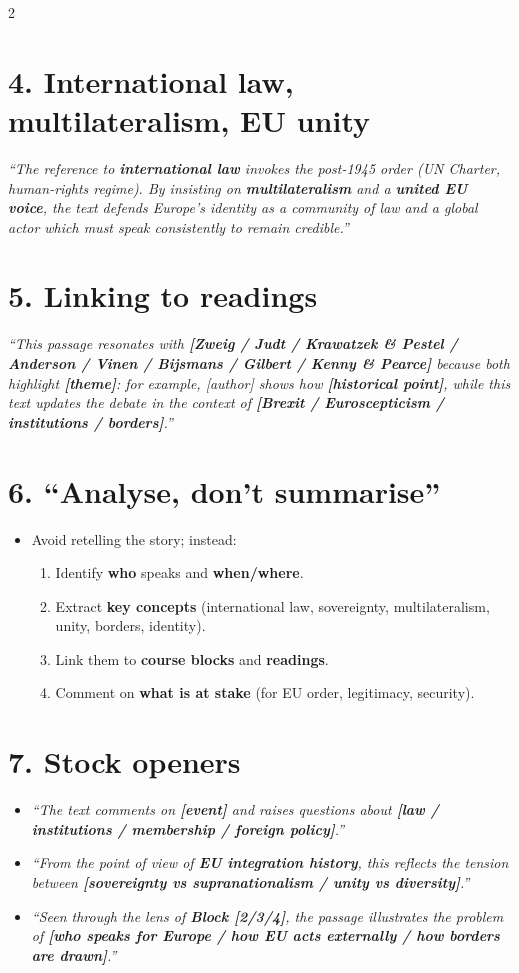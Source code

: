 \documentclass[10pt,a4paper]{article}
\begin{document}
\begin{multicols}{2}
\section*{\color{eublue}4. International law, multilateralism, EU unity}
\emph{``The reference to \textbf{international law} invokes the post-1945 order (UN Charter, human-rights regime). By insisting on \textbf{multilateralism} and a \textbf{united EU voice}, the text defends Europe’s identity as a community of law and a global actor which must speak consistently to remain credible.''}

\section*{\color{eublue}5. Linking to readings}
\emph{``This passage resonates with \textbf{[Zweig / Judt / Krawatzek \& Pestel / Anderson / Vinen / Bijsmans / Gilbert / Kenny \& Pearce]} because both highlight \textbf{[theme]}: for example, [author] shows how \textbf{[historical point]}, while this text updates the debate in the context of \textbf{[Brexit / Euroscepticism / institutions / borders]}.''}

\section*{\color{eublue}6. ``Analyse, don’t summarise''}
\begin{itemize}
\item Avoid retelling the story; instead:
  \begin{enumerate}
  \item Identify \textbf{who} speaks and \textbf{when/where}.
  \item Extract \textbf{key concepts} (international law, sovereignty, multilateralism, unity, borders, identity).
  \item Link them to \textbf{course blocks} and \textbf{readings}.
  \item Comment on \textbf{what is at stake} (for EU order, legitimacy, security).
  \end{enumerate}
\end{itemize}

\section*{\color{eublue}7. Stock openers}
\begin{itemize}
\item \emph{``The text comments on \textbf{[event]} and raises questions about \textbf{[law / institutions / membership / foreign policy]}.''}
\item \emph{``From the point of view of \textbf{EU integration history}, this reflects the tension between \textbf{[sovereignty vs supranationalism / unity vs diversity]}.''}
\item \emph{``Seen through the lens of \textbf{Block [2/3/4]}, the passage illustrates the problem of \textbf{[who speaks for Europe / how EU acts externally / how borders are drawn]}.''}
\end{itemize}


\end{multicols}
\end{document}
